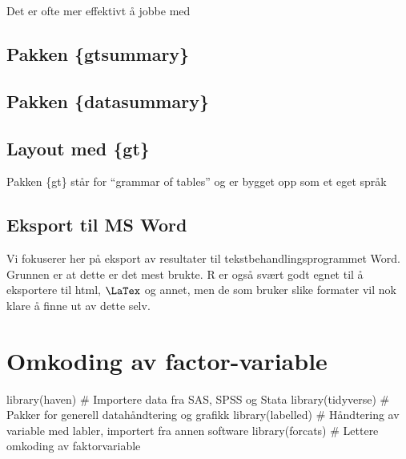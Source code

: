 \documentclass[
  letterpaper,
  DIV=11,
  numbers=noendperiod]{scrreprt}
\newenvironment{Shaded}{\begin{snugshade}}{\end{snugshade}}
\newcommand{\CommentTok}[1]{\textcolor[rgb]{0.37,0.37,0.37}{#1}}
\newcommand{\FunctionTok}[1]{\textcolor[rgb]{0.28,0.35,0.67}{#1}}
\newcommand{\NormalTok}[1]{\textcolor[rgb]{0.00,0.23,0.31}{#1}}
\begin{document}
Det er ofte mer effektivt å jobbe med

\hypertarget{pakken-gtsummary}{%
\section{Pakken \{gtsummary\}}\label{pakken-gtsummary}}

\hypertarget{pakken-datasummary}{%
\section{Pakken \{datasummary\}}\label{pakken-datasummary}}

\hypertarget{layout-med-gt}{%
\section{Layout med \{gt\}}\label{layout-med-gt}}

Pakken \{gt\} står for ``grammar of tables'' og er bygget opp som et
eget språk

\hypertarget{eksport-til-ms-word}{%
\section{Eksport til MS Word}\label{eksport-til-ms-word}}

Vi fokuserer her på eksport av resultater til tekstbehandlingsprogrammet
Word. Grunnen er at dette er det mest brukte. R er også svært godt egnet
til å eksportere til html, \(\LaTex\) og annet, men de som bruker slike
formater vil nok klare å finne ut av dette selv.


\hypertarget{omkoding-av-factor-variable}{%
\chapter{Omkoding av
factor-variable}\label{omkoding-av-factor-variable}}

\begin{Shaded}
\begin{Highlighting}[]
\FunctionTok{library}\NormalTok{(haven)       }\CommentTok{\# Importere data fra SAS, SPSS og Stata}
\FunctionTok{library}\NormalTok{(tidyverse)   }\CommentTok{\# Pakker for generell datahåndtering og grafikk}
\FunctionTok{library}\NormalTok{(labelled)    }\CommentTok{\# Håndtering av variable med labler, importert fra annen software}
\FunctionTok{library}\NormalTok{(forcats)     }\CommentTok{\# Lettere omkoding av faktorvariable}
\end{Highlighting}
\end{Shaded}
\end{document}
